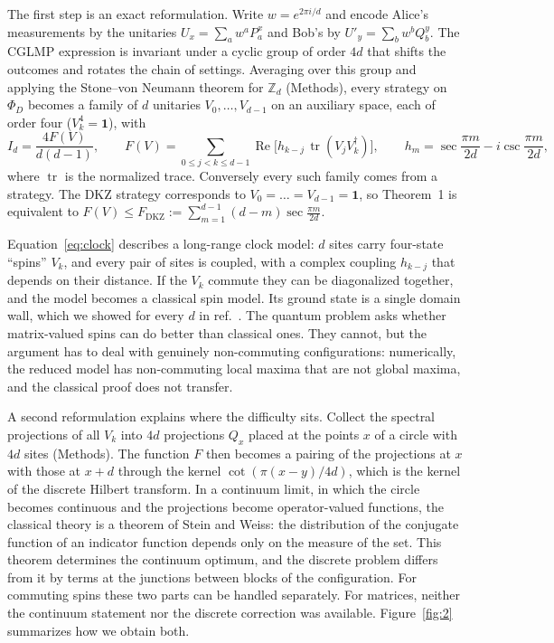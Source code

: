 \documentclass[11pt]{article}
\newcommand{\tr}{\operatorname{tr}}
\newcommand{\Z}{\mathbb{Z}}
\newcommand{\one}{\mathbf{1}}
\newcommand{\FD}{F_{\mathrm{DKZ}}}
\renewcommand{\Re}{\operatorname{Re}}
\begin{document}
The first step is an exact reformulation\cite{classical2026}. Write $w=e^{2\pi i/d}$ and encode Alice's measurements
by the unitaries $U_x=\sum_aw^aP^x_a$ and Bob's by $U'_y=\sum_bw^bQ^y_b$. The CGLMP expression is invariant under a
cyclic group of order $4d$ that shifts the outcomes and rotates the chain of settings. Averaging over this group and
applying the Stone--von Neumann theorem for $\Z_d$ (Methods), every strategy on $\Phi_D$ becomes a family of $d$
unitaries $V_0,\dots,V_{d-1}$ on an auxiliary space, each of order four ($V_k^4=\one$), with
\begin{equation}\label{eq:clock}
I_d=\frac{4F(V)}{d(d-1)},\qquad F(V)=\sum_{0\le j<k\le d-1}\Re\bigl[h_{k-j}\,\tr(V_jV_k^\dagger)\bigr],\qquad
h_m=\sec\frac{\pi m}{2d}-i\csc\frac{\pi m}{2d},
\end{equation}
where $\tr$ is the normalized trace. Conversely every such family comes from a strategy. The DKZ strategy corresponds
to $V_0=\dots=V_{d-1}=\one$, so Theorem~1 is equivalent to $F(V)\le\FD:=\sum_{m=1}^{d-1}(d-m)\sec\frac{\pi m}{2d}$.

Equation~\eqref{eq:clock} describes a long-range clock model: $d$ sites carry four-state ``spins'' $V_k$, and every pair
of sites is coupled, with a complex coupling $h_{k-j}$ that depends on their distance. If the $V_k$ commute they can be
diagonalized together, and the model becomes a classical spin model. Its ground state is a single domain wall, which
we showed for every $d$ in ref.~. The quantum problem asks whether matrix-valued spins can
do better than classical ones. They cannot, but the argument has to deal with genuinely non-commuting configurations:
numerically, the reduced model has non-commuting local maxima that are not global maxima, and the classical proof does
not transfer.

A second reformulation explains where the difficulty sits. Collect the spectral projections of all $V_k$ into $4d$
projections $Q_x$ placed at the points $x$ of a circle with $4d$ sites (Methods). The function $F$ then becomes a
pairing of the projections at $x$ with those at $x+d$ through the kernel $\cot(\pi(x-y)/4d)$, which is the
kernel of the discrete Hilbert transform. In a continuum limit, in which the circle becomes continuous and the
projections become operator-valued functions, the classical theory is a theorem of Stein and Weiss: the distribution
of the conjugate function of an indicator function depends only on the measure of the set\cite{SteinWeiss1959}. This
theorem determines the continuum optimum, and the discrete problem differs from it by terms at the junctions between
blocks of the configuration. For commuting spins these two parts can be handled separately\cite{classical2026}. For
matrices, neither the continuum statement nor the discrete correction was available. Figure~\ref{fig:2} summarizes how
we obtain both.
\end{document}

